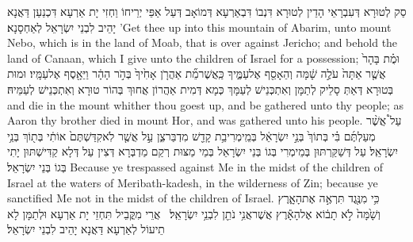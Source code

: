 {סַק לְטוּרָא דְּעִבְרָאֵי הָדֵין לְטוּרָא דִּנְבוֹ דִּבְאַרְעָא דְּמוֹאָב דְּעַל אַפֵּי יְרֵיחוֹ וַחְזִי יָת אַרְעָא דִּכְנַעַן דַּאֲנָא יָהֵיב לִבְנֵי יִשְׂרָאֵל לְאַחְסָנָא׃}
{’Get thee up into this mountain of Abarim, unto mount Nebo, which is in the land of Moab, that is over against Jericho; and behold the land of Canaan, which I give unto the children of Israel for a possession;}{}
{וּמֻ֗ת בָּהָר֙ אֲשֶׁ֤ר אַתָּה֙ עֹלֶ֣ה שָׁ֔מָּה וְהֵאָסֵ֖ף אֶל\maqqaf עַמֶּ֑יךָ כַּֽאֲשֶׁר\maqqaf מֵ֞ת אַהֲרֹ֤ן אָחִ֙יךָ֙ בְּהֹ֣ר הָהָ֔ר וַיֵּאָ֖סֶף אֶל\maqqaf עַמָּֽיו׃}
{וּמוּת בְּטוּרָא דְּאַתְּ סָלֵיק לְתַמָּן וְאִתְכְּנֵישׁ לְעַמָּךְ כְּמָא דְּמִית אַהֲרוֹן אֲחוּךְ בְּהוֹר טוּרָא וְאִתְכְּנֵישׁ לְעַמֵּיהּ׃}
{and die in the mount whither thou goest up, and be gathered unto thy people; as Aaron thy brother died in mount Hor, and was gathered unto his people.}{}
{עַל֩ אֲשֶׁ֨ר מְעַלְתֶּ֜ם בִּ֗י בְּתוֹךְ֙ בְּנֵ֣י יִשְׂרָאֵ֔ל בְּמֵֽי\maqqaf מְרִיבַ֥ת קָדֵ֖שׁ מִדְבַּר\maqqaf צִ֑ן עַ֣ל אֲשֶׁ֤ר לֹֽא\maqqaf קִדַּשְׁתֶּם֙ אוֹתִ֔י בְּת֖וֹךְ בְּנֵ֥י יִשְׂרָאֵֽל׃}
{עַל דְּשַׁקַּרְתּוּן בְּמֵימְרִי בְּגוֹ בְּנֵי יִשְׂרָאֵל בְּמֵי מַצּוּת רְקַם מַדְבְּרָא דְּצִין עַל דְּלָא קַדִּישְׁתּוּן יָתִי בְּגוֹ בְּנֵי יִשְׂרָאֵל׃}
{Because ye trespassed against Me in the midst of the children of Israel at the waters of Meribath-kadesh, in the wilderness of Zin; because ye sanctified Me not in the midst of the children of Israel.}{}
{כִּ֥י מִנֶּ֖גֶד תִּרְאֶ֣ה אֶת\maqqaf הָאָ֑רֶץ וְשָׁ֙מָּה֙ לֹ֣א תָב֔וֹא אֶל\maqqaf הָאָ֕רֶץ אֲשֶׁר\maqqaf אֲנִ֥י נֹתֵ֖ן לִבְנֵ֥י יִשְׂרָאֵֽל׃ \petucha }
{אֲרֵי מִקֳּבֵיל תִּחְזֵי יָת אַרְעָא וּלְתַמָּן לָא תֵיעוֹל לְאַרְעָא דַּאֲנָא יָהֵיב לִבְנֵי יִשְׂרָאֵל׃}
